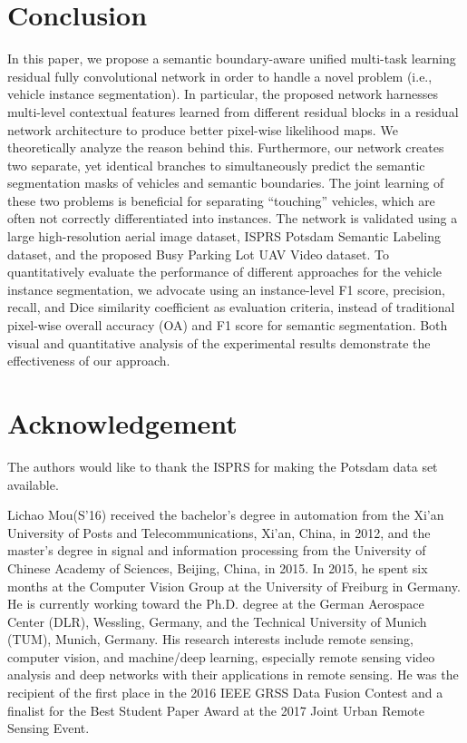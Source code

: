 \documentclass[journal]{IEEEtran}
\begin{document}
\section{Conclusion}
\label{sec:conc}
In this paper, we propose a semantic boundary-aware unified multi-task learning residual fully convolutional network in order to handle a novel problem (i.e., vehicle instance segmentation). In particular, the proposed network harnesses multi-level contextual features learned from different residual blocks in a residual network architecture to produce better pixel-wise likelihood maps. We theoretically analyze the reason behind this. Furthermore, our network creates two separate, yet identical branches to simultaneously predict the semantic segmentation masks of vehicles and semantic boundaries. The joint learning of these two problems is beneficial for separating ``touching'' vehicles, which are often not correctly differentiated into instances. The network is validated using a large high-resolution aerial image dataset, ISPRS Potsdam Semantic Labeling dataset, and the proposed Busy Parking Lot UAV Video dataset. To quantitatively evaluate the performance of different approaches for the vehicle instance segmentation, we advocate using an instance-level F1 score, precision, recall, and Dice similarity coefficient as evaluation
criteria, instead of traditional pixel-wise overall accuracy (OA) and F1 score for semantic segmentation. Both visual and quantitative analysis of the experimental results demonstrate the effectiveness of our approach.

\section*{Acknowledgement}
The authors would like to thank the ISPRS for making the Potsdam data set available.

\ifCLASSOPTIONcaptionsoff
  \newpage
\fi




\begin{IEEEbiography}{Lichao Mou}(S'16)
received the bachelor's degree in automation from the Xi'an University of Posts and Telecommunications, Xi'an, China, in 2012, and the master's degree in signal and information processing from the University of Chinese Academy of Sciences, Beijing, China, in 2015. In 2015, he spent six months at the Computer Vision Group at the University of Freiburg in Germany. He is currently working toward the Ph.D. degree at the German Aerospace Center (DLR), Wessling, Germany, and the Technical University of Munich (TUM), Munich, Germany. His research interests include remote sensing, computer vision, and machine/deep learning, especially remote sensing video analysis and deep networks with their applications in remote sensing. He was the recipient of the first place in the 2016 IEEE GRSS Data Fusion Contest and a finalist for the Best Student Paper Award at the 2017 Joint Urban Remote Sensing Event.
\end{IEEEbiography}
\end{document}
